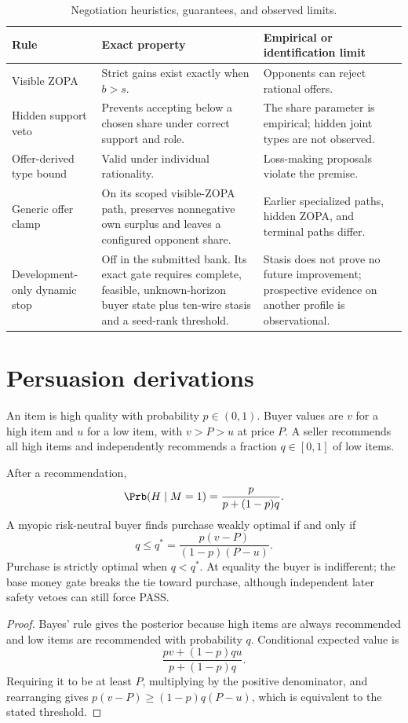 \begin{table}[h]
\centering
\small
\caption{Negotiation heuristics, guarantees, and observed limits.}
\label{tab:nego_heuristics}
\begin{tabularx}{\linewidth}{@{}p{3.1cm}p{5.0cm}Y@{}}
\toprule
Rule & Exact property & Empirical or identification limit \\
\midrule
Visible ZOPA & Strict gains exist exactly when $b>s$. & Opponents can reject rational offers. \\
Hidden support veto & Prevents accepting below a chosen share under correct support and role. & The share parameter is empirical; hidden joint types are not observed. \\
Offer-derived type bound & Valid under individual rationality. & Loss-making proposals violate the premise. \\
Generic offer clamp & On its scoped visible-ZOPA path, preserves nonnegative own surplus and leaves a configured opponent share. & Earlier specialized paths, hidden ZOPA, and terminal paths differ. \\
Development-only dynamic stop & Off in the submitted bank. Its exact gate requires complete, feasible, unknown-horizon buyer state plus ten-wire stasis and a seed-rank threshold. & Stasis does not prove no future improvement; prospective evidence on another profile is observational. \\
\bottomrule
\end{tabularx}
\end{table}

\section{Persuasion derivations}
\label{app:persuasion}

An item is high quality with probability $p\in(0,1)$. Buyer values are $v$ for
a high item and $u$ for a low item, with $v>P>u$ at price $P$. A seller
recommends all high items and independently recommends a fraction
$q\in[0,1]$ of low items.

\begin{proposition}
After a recommendation,
\begin{equation}
\Prb(H\mid M=1)=\frac{p}{p+(1-p)q}.
\end{equation}
A myopic risk-neutral buyer finds purchase weakly optimal if and only if
\begin{equation}
q\leq q^*=\frac{p(v-P)}{(1-p)(P-u)}.
\end{equation}
Purchase is strictly optimal when $q<q^*$. At equality the buyer is indifferent;
the base money gate breaks the tie toward purchase, although independent later
safety vetoes can still force PASS.
\end{proposition}
\begin{proof}
Bayes' rule gives the posterior because high items are always recommended and
low items are recommended with probability $q$. Conditional expected value is
\[
\frac{pv+(1-p)qu}{p+(1-p)q}.
\]
Requiring it to be at least $P$, multiplying by the positive denominator, and
rearranging gives
$p(v-P)\geq(1-p)q(P-u)$, which is equivalent to the stated threshold.
\end{proof}

